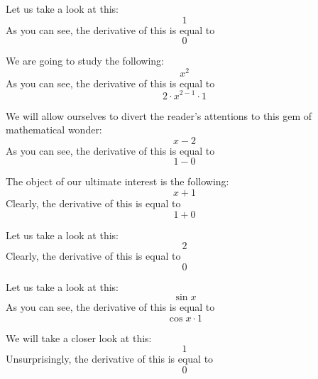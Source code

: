 \documentclass{article}
\begin{document}
Let us take a look at this:
\begin{equation}
1 
\end{equation}
As you can see, the derivative of this is equal to
\begin{equation}
0 
\end{equation}

We are going to study the following:
\begin{equation}
x ^{2 } 
\end{equation}
As you can see, the derivative of this is equal to
\begin{equation}
2 \cdot x ^{2 - 1 } \cdot 1 
\end{equation}

We will allow ourselves to divert the reader's attentions to this gem of mathematical wonder:
\begin{equation}
x - 2 
\end{equation}
As you can see, the derivative of this is equal to
\begin{equation}
1 - 0 
\end{equation}

The object of our ultimate interest is the following:
\begin{equation}
x + 1 
\end{equation}
Clearly, the derivative of this is equal to
\begin{equation}
1 + 0 
\end{equation}

Let us take a look at this:
\begin{equation}
2 
\end{equation}
Clearly, the derivative of this is equal to
\begin{equation}
0 
\end{equation}

Let us take a look at this:
\begin{equation}
\sin x 
\end{equation}
As you can see, the derivative of this is equal to
\begin{equation}
\cos x \cdot 1 
\end{equation}

We will take a closer look at this:
\begin{equation}
1 
\end{equation}
Unsurprisingly, the derivative of this is equal to
\begin{equation}
0 
\end{equation}
\end{document}
